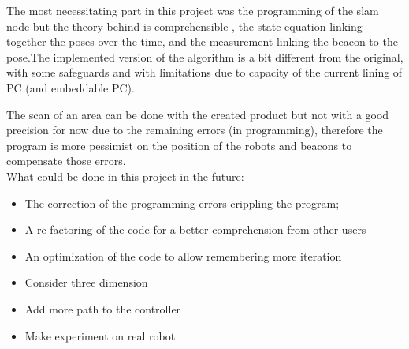 The most necessitating part in this project was the programming of the slam node but the theory behind is comprehensible , the state equation linking together the poses over the time, and the measurement linking the beacon to the pose.The implemented version of the algorithm is a bit different from the original, with some safeguards and with limitations due to capacity of the current lining of PC (and embeddable PC).

The scan of an area can be done with the created product but not with a good precision for now due to the remaining errors (in programming), therefore the program is more pessimist on the position of the robots and beacons to compensate those errors.\\

What could be done in this project in the future:
\begin{itemize}[label={$-$},itemsep=0cm,topsep=0cm]
\item The correction of the programming errors crippling the program;
\item A re-factoring of the code for a better comprehension from other users
\item An optimization of the code to allow remembering more iteration
\item Consider three dimension
\item Add more path to the controller
\item Make experiment on real robot
\end{itemize}
